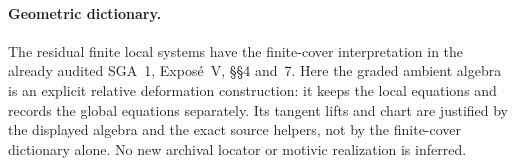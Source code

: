 \paragraph{Geometric dictionary.}
The residual finite local systems have the finite-cover
interpretation in the already audited SGA~1, Expos\'e~V,
\S\S4 and~7.  Here the graded ambient algebra is an
explicit relative deformation construction: it keeps
the local equations and records the global equations
separately.  Its tangent lifts and chart are justified
by the displayed algebra and the exact source helpers,
not by the finite-cover dictionary alone.  No new
archival locator or motivic realization is inferred.
